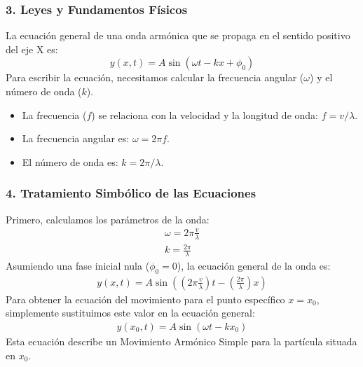 \subsubsection*{3. Leyes y Fundamentos Físicos}
La ecuación general de una onda armónica que se propaga en el sentido positivo del eje X es:
$$ y(x,t) = A \sin(\omega t - kx + \phi_0) $$
Para escribir la ecuación, necesitamos calcular la frecuencia angular ($\omega$) y el número de onda ($k$).
\begin{itemize}
    \item La frecuencia ($f$) se relaciona con la velocidad y la longitud de onda: $f = v/\lambda$.
    \item La frecuencia angular es: $\omega = 2\pi f$.
    \item El número de onda es: $k = 2\pi/\lambda$.
\end{itemize}

\subsubsection*{4. Tratamiento Simbólico de las Ecuaciones}
Primero, calculamos los parámetros de la onda:
\begin{gather}
    \omega = 2\pi \frac{v}{\lambda} \\
    k = \frac{2\pi}{\lambda}
\end{gather}
Asumiendo una fase inicial nula ($\phi_0=0$), la ecuación general de la onda es:
\begin{gather}
    y(x,t) = A \sin\left( \left(2\pi \frac{v}{\lambda}\right)t - \left(\frac{2\pi}{\lambda}\right)x \right)
\end{gather}
Para obtener la ecuación del movimiento para el punto específico $x=x_0$, simplemente sustituimos este valor en la ecuación general:
\begin{gather}
    y(x_0, t) = A \sin(\omega t - kx_0)
\end{gather}
Esta ecuación describe un Movimiento Armónico Simple para la partícula situada en $x_0$.

